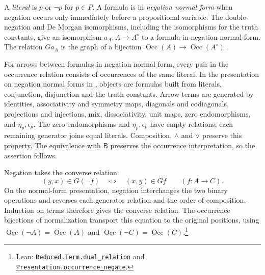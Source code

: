 \documentclass[11pt]{article}
\newcommand{\B}{\mathsf B}
\newcommand{\Occ}{\operatorname{Occ}}
\begin{document}
A \emph{literal} is $p$ or $\neg p$ for $p\in P$.
A formula is in \emph{negation normal form} when negation occurs only
immediately before a propositional variable. The double-negation and
De Morgan isomorphisms, including the isomorphisms for the truth
constants, give an isomorphism $a_A:A\to A^\circ$ to a formula in
negation normal form. The relation $Ga_A$ is the graph of a bijection
$\Occ(A)\to\Occ(A^\circ)$
\cite[\S14.1, pp.~313--315]{DP}.

For arrows between formulas in negation normal form, every pair in
the occurrence relation consists of occurrences of the same literal.
In the presentation on negation normal forms in
\cite[\S14.2, pp.~318--321]{DP}, objects are formulas built from
literals, conjunction, disjunction and the truth constants.
Arrow terms are generated by identities, associativity and symmetry
maps, diagonals and codiagonals, projections and injections, mix,
dissociativity, unit maps, zero endomorphisms, and $\eta_p,\epsilon_p$.
The zero endomorphisms and $\eta_p,\epsilon_p$ have empty relations;
each remaining generator joins equal literals.
Composition, $\wedge$ and $\vee$ preserve this property.
The equivalence with $\B$ preserves the occurrence interpretation,
so the assertion follows.

Negation takes the converse relation:
\[
 (y,x)\in G(\neg f)\quad\Longleftrightarrow\quad(x,y)\in Gf
 \qquad(f:A\to C).
\]
On the normal-form presentation, negation interchanges the two
binary operations and reverses each generator relation and the
order of composition. Induction on terms therefore gives the
converse relation. The occurrence bijections of normalization
transport this equation to the original positions, using
$\Occ(\neg A)=\Occ(A)$ and $\Occ(\neg C)=\Occ(C)$.\footnote{\raggedright Lean:
\href{https://github.com/flengyel/Dosen-Petric-Maximality/blob/5dbee39bea09539bd130f729e82636419f71f920/DosenPetric/ReducedDualRelations.lean\#L20}{\texttt{Reduced.Term.\allowbreak{}dual\_relation}} and
\href{https://github.com/flengyel/Dosen-Petric-Maximality/blob/5dbee39bea09539bd130f729e82636419f71f920/DosenPetric/PresentationNegationOccurrence.lean\#L25}{\texttt{Presentation.\allowbreak{}occurrence\_negate}}.}
\end{document}
